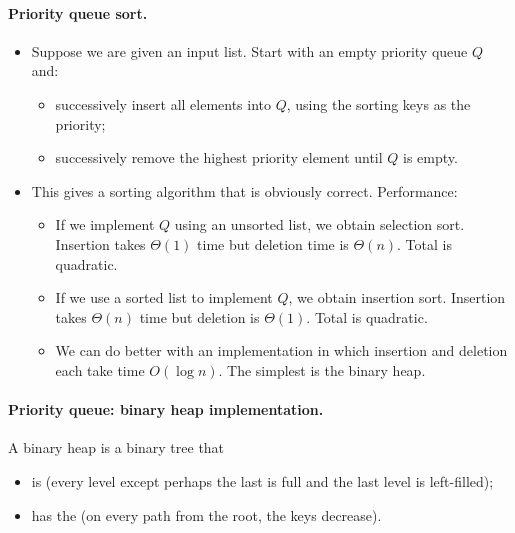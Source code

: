 \paragraph{Priority queue sort.}
\begin{itemize}
\item Suppose we are given an input list. Start with an empty priority queue $Q$
 and:
\begin{itemize}
\item successively insert all elements into $Q$, using the sorting keys as the 
priority;
\item successively remove the highest priority element until $Q$ is empty. 
\end{itemize}
\item This gives a sorting algorithm that is obviously correct. Performance:
\begin{itemize}
\item If we implement $Q$ using an unsorted list, we obtain selection sort. 
Insertion takes $\Theta(1)$ time but deletion time is $\Theta(n)$. Total is quadratic.
\item If we use a sorted list to implement $Q$, we obtain insertion sort. 
Insertion takes $\Theta(n)$ time but deletion is $\Theta(1)$. Total is quadratic.
\item We can do better with an implementation in which insertion and deletion 
each take time $O(\log n)$. The simplest is the \alert{binary heap}.
\end{itemize}
\end{itemize}

\paragraph{Priority queue: binary heap implementation.}
\begin{Definition}
A \alert{binary heap} is a binary tree that 
\begin{itemize}
\item is  (every level except perhaps the last is full and 
the last level is left-filled);
\item has the  (on every path from the root, the keys decrease). 
\end{itemize}
\end{Definition}

